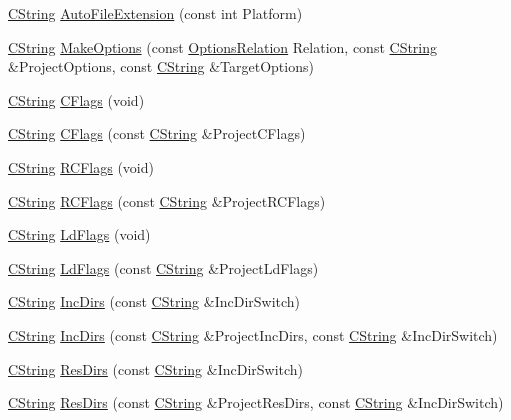 \begin{DoxyCompactItemize}
\item 
\hyperlink{classCString}{C\-String} \hyperlink{classCBuildTarget_ac202a744e5ce09fff6a7c5b069d4d472}{Auto\-File\-Extension} (const int Platform)
\item 
\hyperlink{classCString}{C\-String} \hyperlink{classCBuildTarget_a0a5b72aec11a5557a4cdab09c80cf398}{Make\-Options} (const \hyperlink{classCBuildTarget_a65a8d160e9cb9cc5632373836e0adb9e}{Options\-Relation} Relation, const \hyperlink{classCString}{C\-String} \&Project\-Options, const \hyperlink{classCString}{C\-String} \&Target\-Options)
\item 
\hyperlink{classCString}{C\-String} \hyperlink{classCBuildTarget_a01596962482210ddf57c073c3d2d5a79}{C\-Flags} (void)
\item 
\hyperlink{classCString}{C\-String} \hyperlink{classCBuildTarget_a346e7b7ef105a1e471e30fb1a2334efd}{C\-Flags} (const \hyperlink{classCString}{C\-String} \&Project\-C\-Flags)
\item 
\hyperlink{classCString}{C\-String} \hyperlink{classCBuildTarget_a95adb69caa6182e6817d1766e3800e5a}{R\-C\-Flags} (void)
\item 
\hyperlink{classCString}{C\-String} \hyperlink{classCBuildTarget_a0ea25f287154d79acb94d2ce79d34c01}{R\-C\-Flags} (const \hyperlink{classCString}{C\-String} \&Project\-R\-C\-Flags)
\item 
\hyperlink{classCString}{C\-String} \hyperlink{classCBuildTarget_a126b179e98d25123a27e515e4e35e9c4}{Ld\-Flags} (void)
\item 
\hyperlink{classCString}{C\-String} \hyperlink{classCBuildTarget_ab0fef1c7a4e9e6a7a7e3f3fa80d5af9a}{Ld\-Flags} (const \hyperlink{classCString}{C\-String} \&Project\-Ld\-Flags)
\item 
\hyperlink{classCString}{C\-String} \hyperlink{classCBuildTarget_aa5f434c9bee3c8bc1d1491497ab476fc}{Inc\-Dirs} (const \hyperlink{classCString}{C\-String} \&Inc\-Dir\-Switch)
\item 
\hyperlink{classCString}{C\-String} \hyperlink{classCBuildTarget_af7d3a568a1b326749c6fa9e003046b64}{Inc\-Dirs} (const \hyperlink{classCString}{C\-String} \&Project\-Inc\-Dirs, const \hyperlink{classCString}{C\-String} \&Inc\-Dir\-Switch)
\item 
\hyperlink{classCString}{C\-String} \hyperlink{classCBuildTarget_aa3126d4d24703558a4434b1a2c24f54c}{Res\-Dirs} (const \hyperlink{classCString}{C\-String} \&Inc\-Dir\-Switch)
\item 
\hyperlink{classCString}{C\-String} \hyperlink{classCBuildTarget_a50897314665969727bf7e9eef4d68a11}{Res\-Dirs} (const \hyperlink{classCString}{C\-String} \&Project\-Res\-Dirs, const \hyperlink{classCString}{C\-String} \&Inc\-Dir\-Switch)

\end{DoxyCompactItemize}
